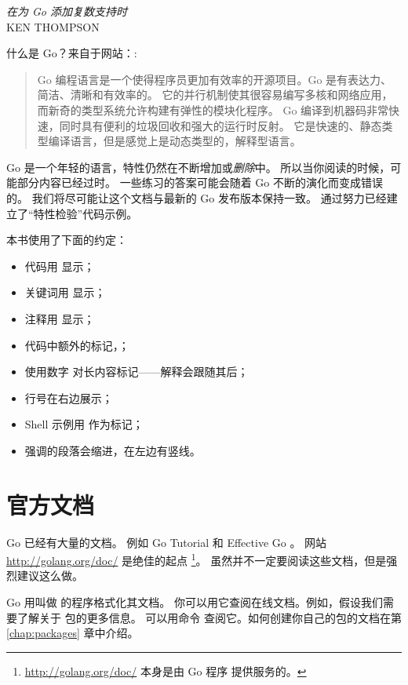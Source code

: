 {\textit{在为 Go 添加复数支持时}\\ \textsc{KEN THOMPSON}}

\noindent{}什么是 Go？来自于网站：\cite{go_web}:
\begin{quote}
Go 编程语言是一个使得程序员更加有效率的开源项目。Go 是有表达力、简洁、清晰和有效率的。
它的并行机制使其很容易编写多核和网络应用，而新奇的类型系统允许构建有弹性的模块化程序。
Go 编译到机器码非常快速，同时具有便利的垃圾回收和强大的运行时反射。
它是快速的、静态类型编译语言，但是感觉上是动态类型的，解释型语言。
\end{quote}

Go 是一个年轻的语言，特性仍然在不断增加或\emph{删除}中。
所以当你阅读的时候，可能部分内容已经过时。
一些练习的答案可能会随着 Go 不断的演化而变成错误的。
我们将尽可能让这个文档与最新的 Go 发布版本保持一致。
通过努力已经建立了``特性检验''代码示例。

本书使用了下面的约定：
\begin{itemize}
\item 代码用  显示；
\item 关键词用  显示；
\item 注释用  显示；
\item 代码中额外的标记，；
\item 使用数字  对长内容标记——解释会跟随其后；
\item 行号在右边展示；
\item Shell 示例用 \pr{} 作为标记；
\item 强调的段落会缩进，在左边有竖线。
\end{itemize}

\section{官方文档}
Go 已经有大量的文档。
例如 Go Tutorial \cite{go_tutorial} 和 Effective Go \cite{effective_go}。
网站 \url{http://golang.org/doc/} 是绝佳的起点 
\footnote{\url{http://golang.org/doc/} 本身是由 Go 程序  提供服务的。}。
虽然并不一定要阅读这些文档，但是强烈建议这么做。

Go 用叫做  的程序格式化其文档。
你可以用它查阅在线文档。例如，假设我们需要了解关于  包的更多信息。
可以用命令  查阅它。如何创建你自己的包的文档在第
\ref{chap:packages} 章中介绍。

